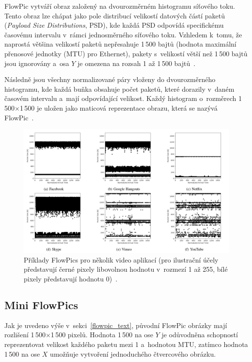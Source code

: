 FlowPic vytváří obraz založený na dvourozměrném histogramu síťového toku. Tento obraz lze chápat jako pole distribucí velikostí datových částí paketů (\textit{Payload Size Distributions}, PSD), kde každá PSD odpovídá specifickému časovému intervalu v~rámci jednosměrného síťového toku. Vzhledem k~tomu, že naprostá většina velikostí paketů nepřesahuje 1\,500 bajtů (hodnota maximální přenosové jednotky (MTU) pro Ethernet), pakety s~velikostí větší než 1\,500 bajtů jsou ignorovány a~osa $Y$ je omezena na rozsah 1 až 1\,500 bajtů~\cite{FlowPic_classification}.  

Následně jsou všechny normalizované páry vloženy do dvourozměrného histogramu, kde každá buňka obsahuje počet paketů, které dorazily v~daném časovém intervalu a~mají odpovídající velikost. Každý histogram o~rozměrech 1\,500$\times$1\,500 je uložen jako maticová reprezentace obrazu, která se nazývá FlowPic~\cite{FlowPic_classification}.
\begin{figure}[H]
	\centering
	\includegraphics[width=1\textwidth]{obrazky-figures/flowpic.png}
	\caption{Příklady FlowPics pro několik video aplikací (pro ilustrační účely představují černé pixely libovolnou hodnotu v~rozmezí 1 až 255, bílé pixely představují hodnotu 0)~\cite{FlowPic}.}
	\label{flowpic}
\end{figure}

\subsection{Mini FlowPics}
\label{mini_flowpics}
Jak je uvedeno výše v~sekci~\ref{flowpic_text}, původní FlowPic obrázky mají rozlišení 1\,500$\times$1\,500 pixelů. Hodnota 1\,500 na ose $Y$ je odůvodněna schopností reprezentovat velikost každého paketu mezi 1 a~hodnotou MTU, zatímco hodnota 1\,500 na ose $X$ umožňuje vytvoření jednoduchého čtvercového obrázku.


